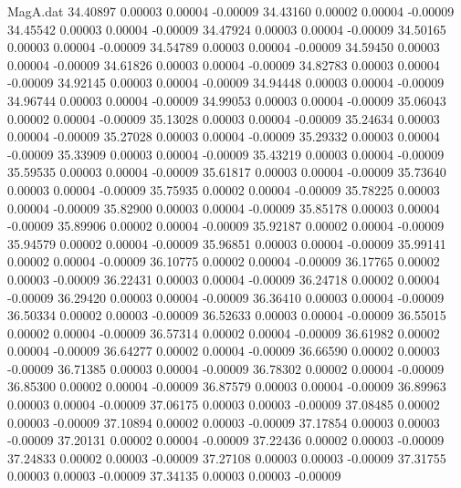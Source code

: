 \begin{filecontents}{MagA.dat}
  34.40897    0.00003    0.00004   -0.00009
  34.43160    0.00002    0.00004   -0.00009
  34.45542    0.00003    0.00004   -0.00009
  34.47924    0.00003    0.00004   -0.00009
  34.50165    0.00003    0.00004   -0.00009
  34.54789    0.00003    0.00004   -0.00009
  34.59450    0.00003    0.00004   -0.00009
  34.61826    0.00003    0.00004   -0.00009
  34.82783    0.00003    0.00004   -0.00009
  34.92145    0.00003    0.00004   -0.00009
  34.94448    0.00003    0.00004   -0.00009
  34.96744    0.00003    0.00004   -0.00009
  34.99053    0.00003    0.00004   -0.00009
  35.06043    0.00002    0.00004   -0.00009
  35.13028    0.00003    0.00004   -0.00009
  35.24634    0.00003    0.00004   -0.00009
  35.27028    0.00003    0.00004   -0.00009
  35.29332    0.00003    0.00004   -0.00009
  35.33909    0.00003    0.00004   -0.00009
  35.43219    0.00003    0.00004   -0.00009
  35.59535    0.00003    0.00004   -0.00009
  35.61817    0.00003    0.00004   -0.00009
  35.73640    0.00003    0.00004   -0.00009
  35.75935    0.00002    0.00004   -0.00009
  35.78225    0.00003    0.00004   -0.00009
  35.82900    0.00003    0.00004   -0.00009
  35.85178    0.00003    0.00004   -0.00009
  35.89906    0.00002    0.00004   -0.00009
  35.92187    0.00002    0.00004   -0.00009
  35.94579    0.00002    0.00004   -0.00009
  35.96851    0.00003    0.00004   -0.00009
  35.99141    0.00002    0.00004   -0.00009
  36.10775    0.00002    0.00004   -0.00009
  36.17765    0.00002    0.00003   -0.00009
  36.22431    0.00003    0.00004   -0.00009
  36.24718    0.00002    0.00004   -0.00009
  36.29420    0.00003    0.00004   -0.00009
  36.36410    0.00003    0.00004   -0.00009
  36.50334    0.00002    0.00003   -0.00009
  36.52633    0.00003    0.00004   -0.00009
  36.55015    0.00002    0.00004   -0.00009
  36.57314    0.00002    0.00004   -0.00009
  36.61982    0.00002    0.00004   -0.00009
  36.64277    0.00002    0.00004   -0.00009
  36.66590    0.00002    0.00003   -0.00009
  36.71385    0.00003    0.00004   -0.00009
  36.78302    0.00002    0.00004   -0.00009
  36.85300    0.00002    0.00004   -0.00009
  36.87579    0.00003    0.00004   -0.00009
  36.89963    0.00003    0.00004   -0.00009
  37.06175    0.00003    0.00003   -0.00009
  37.08485    0.00002    0.00003   -0.00009
  37.10894    0.00002    0.00003   -0.00009
  37.17854    0.00003    0.00003   -0.00009
  37.20131    0.00002    0.00004   -0.00009
  37.22436    0.00002    0.00003   -0.00009
  37.24833    0.00002    0.00003   -0.00009
  37.27108    0.00003    0.00003   -0.00009
  37.31755    0.00003    0.00003   -0.00009
  37.34135    0.00003    0.00003   -0.00009

\end{filecontents}

